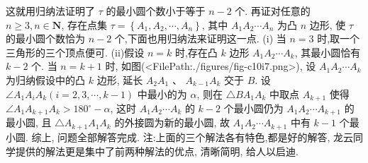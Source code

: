 这就用归纳法证明了 $\tau$ 的最小圆个数小于等于 $n-2$ 个.
再证对任意的 $n \geqslant 3, n \in \mathbf{N}$, 存在点集 $\tau=\left\{A_1, A_2, \cdots, A_n\right\}$, 其中 $A_1 A_2 \cdots A_n$ 为凸 $n$ 边形, 使 $\tau$ 的最小圆个数恰为 $n-2$ 个,下面也用归纳法来证明这一点.
(i) 当 $n=3$ 时,取一个三角形的三个顶点便可.
(ii)假设 $n=k$ 时,存在凸 $k$ 边形 $A_1 A_2 \cdots A_k$, 其最小圆恰有 $k-2$ 个.
当 $n=k+1$ 时, 如图(<FilePath:./figures/fig-c10i7.png>), 设 $A_1 A_2 \cdots A_k$ 为归纳假设中的凸 $k$ 边形, 延长 $A_2 A_1$ 、 $A_{k-1} A_k$ 交于 $B$. 设 $\angle A_1 A_i A_k(i=2,3, \cdots, k-1)$ 中最小的为 $\alpha$, 则在 $\triangle B A_1 A_k$ 中取点 $A_{k+1}$ 使得
$\angle A_1 A_{k+1} A_k>180^{\circ}-\alpha$, 这时 $A_1 A_2 \cdots A_k$ 的 $k-2$ 个最小圆仍为 $A_1 A_2 \cdots A_{k+1}$ 的最小圆, 且 $\triangle A_{k+1} A_1 A_k$ 的外接圆为新的最小圆, 故 $A_1 A_2 \cdots A_{k+1}$ 中有 $k-1$ 个最小圆.
综上, 问题全部解答完成.
注:上面的三个解法各有特色,都是好的解答, 龙云同学提供的解法更是集中了前两种解法的优点, 清晰简明, 给人以启迪.


